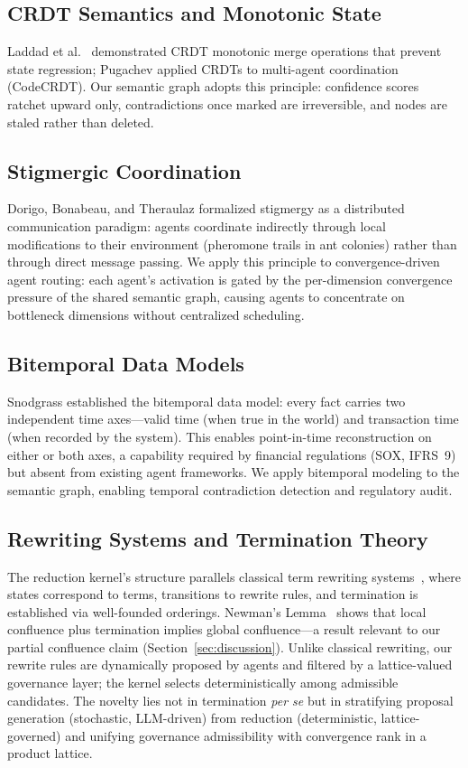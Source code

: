 \documentclass[11pt]{article}
\begin{document}
\subsection{CRDT Semantics and Monotonic State}

Laddad et al.\ \cite{laddad2024} demonstrated CRDT monotonic merge operations that prevent state regression; Pugachev \cite{pugachev2025} applied CRDTs to multi-agent coordination (CodeCRDT). Our semantic graph adopts this principle: confidence scores ratchet upward only, contradictions once marked are irreversible, and nodes are staled rather than deleted.

\subsection{Stigmergic Coordination}

Dorigo, Bonabeau, and Theraulaz \cite{dorigo2000} formalized stigmergy as a distributed communication paradigm: agents coordinate indirectly through local modifications to their environment (pheromone trails in ant colonies) rather than through direct message passing. We apply this principle to convergence-driven agent routing: each agent's activation is gated by the per-dimension convergence pressure of the shared semantic graph, causing agents to concentrate on bottleneck dimensions without centralized scheduling.

\subsection{Bitemporal Data Models}

Snodgrass \cite{snodgrass2000} established the bitemporal data model: every fact carries two independent time axes---valid time (when true in the world) and transaction time (when recorded by the system). This enables point-in-time reconstruction on either or both axes, a capability required by financial regulations (SOX, IFRS~9) but absent from existing agent frameworks. We apply bitemporal modeling to the semantic graph, enabling temporal contradiction detection and regulatory audit.

\subsection{Rewriting Systems and Termination Theory}

The reduction kernel's structure parallels classical term rewriting systems~\cite{baader1998}, where states correspond to terms, transitions to rewrite rules, and termination is established via well-founded orderings. Newman's Lemma~\cite{newman1942} shows that local confluence plus termination implies global confluence---a result relevant to our partial confluence claim (Section~\ref{sec:discussion}). Unlike classical rewriting, our rewrite rules are dynamically proposed by agents and filtered by a lattice-valued governance layer; the kernel selects deterministically among admissible candidates. The novelty lies not in termination \emph{per se} but in stratifying proposal generation (stochastic, LLM-driven) from reduction (deterministic, lattice-governed) and unifying governance admissibility with convergence rank in a product lattice.
\end{document}
